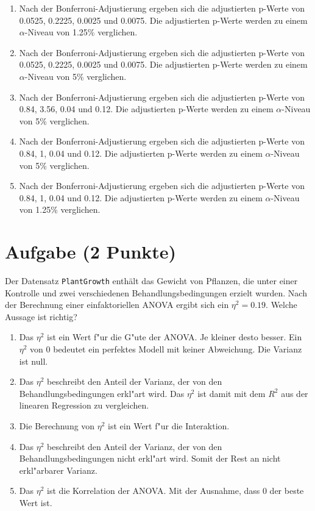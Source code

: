 \documentclass[a4paper, 10pt]{scrartcl}\usepackage[]{graphicx}\usepackage[]{xcolor}
\begin{document}
\begin{enumerate}
\item [\textbf{A} \msquare] Nach der Bonferroni-Adjustierung ergeben sich die adjustierten p-Werte von 0.0525, 0.2225, 0.0025 und 0.0075. Die adjustierten p-Werte werden zu einem $\alpha$-Niveau von 1.25\% verglichen.
\item [\textbf{B} \msquare] Nach der Bonferroni-Adjustierung ergeben sich die adjustierten p-Werte von 0.0525, 0.2225, 0.0025 und 0.0075. Die adjustierten p-Werte werden zu einem $\alpha$-Niveau von 5\% verglichen.
\item [\textbf{C} \msquare] Nach der Bonferroni-Adjustierung ergeben sich die adjustierten p-Werte von 0.84, 3.56, 0.04 und 0.12. Die adjustierten p-Werte werden zu einem $\alpha$-Niveau von 5\% verglichen.
\item [\textbf{D} \msquare] Nach der Bonferroni-Adjustierung ergeben sich die adjustierten p-Werte von 0.84, 1, 0.04 und 0.12. Die adjustierten p-Werte werden zu einem $\alpha$-Niveau von 5\% verglichen.
\item [\textbf{E} \msquare] Nach der Bonferroni-Adjustierung ergeben sich die adjustierten p-Werte von 0.84, 1, 0.04 und 0.12. Die adjustierten p-Werte werden zu einem $\alpha$-Niveau von 1.25\% verglichen.
\end{enumerate} 

\section{Aufgabe \hfill (2 Punkte)}



Der Datensatz \texttt{PlantGrowth} enth{\"a}lt das Gewicht von Pflanzen, die
unter einer Kontrolle und zwei verschiedenen Behandlungsbedingungen erzielt
wurden. Nach der Berechnung einer einfaktoriellen ANOVA ergibt sich ein
$\eta^2 = 0.19$. Welche Aussage ist richtig?



\begin{enumerate}
\item [\textbf{A} \msquare] Das $\eta^2$ ist ein Wert f{"u}r die G{"u}te der ANOVA. Je kleiner desto besser. Ein $\eta^2$ von 0 bedeutet ein perfektes Modell mit keiner Abweichung. Die Varianz ist null.
\item [\textbf{B} \msquare] Das $\eta^2$ beschreibt den Anteil der Varianz, der von den Behandlungsbedingungen erkl{"a}rt wird. Das $\eta^2$ ist damit mit dem $R^2$ aus der linearen Regression zu vergleichen.
\item [\textbf{C} \msquare] Die Berechnung von $\eta^2$ ist ein Wert f{"u}r die Interaktion.
\item [\textbf{D} \msquare] Das $\eta^2$ beschreibt den Anteil der Varianz, der von den Behandlungsbedingungen nicht erkl{"a}rt wird. Somit der Rest an nicht erkl{"a}rbarer Varianz.
\item [\textbf{E} \msquare] Das $\eta^2$ ist die Korrelation der ANOVA. Mit der Ausnahme, dass 0 der beste Wert ist.
\end{enumerate} 
\end{document}

